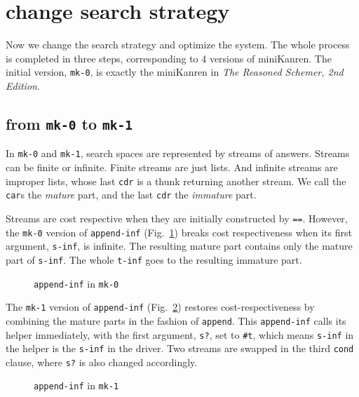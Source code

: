 \documentclass[format=acmlarge, review=true, authordraft=true]{acmart}
\begin{document}




\section{change search strategy}

Now we change the search strategy and optimize the system. The whole process is completed in three steps, corresponding to 4 versions of miniKanren. The initial version, \texttt{mk-0}, is exactly the miniKanren in \emph{The Reasoned Schemer, 2nd Edition}.

\subsection{from \texttt{mk-0} to \texttt{mk-1}}

In \texttt{mk-0} and \texttt{mk-1}, search spaces are represented by streams of answers. Streams can be finite or infinite. Finite streams are just lists. And infinite streams are improper lists, whose last \texttt{cdr} is a thunk returning another stream. We call the \texttt{car}s the \emph{mature} part, and the last \texttt{cdr} the \emph{immature} part. 

Streams are cost respective when they are initially constructed by \texttt{==}. However, the \texttt{mk-0} version of \texttt{append-inf} (Fig.~\ref{append-inf-0}) breaks cost respectiveness when its first argument, \texttt{s-inf}, is infinite. The resulting mature part contains only the mature part of \texttt{s-inf}. The whole \texttt{t-inf} goes to the resulting immature part.

\begin{figure}
	 	
	 \caption{\texttt{append-inf} in \texttt{mk-0}}
	 \label{append-inf-0}
\end{figure}


The \texttt{mk-1} version of \texttt{append-inf} (Fig.~\ref{append-inf-1}) restores cost-respectiveness by combining the mature parts in the fashion of \texttt{append}. This \texttt{append-inf} calls its helper immediately, with the first argument, \texttt{s?}, set to \texttt{\#{}t}, which means \texttt{s-inf} in the helper is the \texttt{s-inf} in the driver. Two streams are swapped in the third \texttt{cond} clause, where \texttt{s?} is also changed accordingly.

\begin{figure}
	 	
	 \caption{\texttt{append-inf} in \texttt{mk-1}}
	 \label{append-inf-1}
\end{figure}
\end{document}

